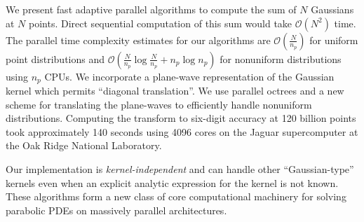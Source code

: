 We present fast adaptive parallel algorithms to compute the sum of $N$ Gaussians at $N$ points. 
Direct sequential computation of this sum would take $\mathcal{O}(N^2)$ time. The parallel time complexity estimates for our algorithms are $ \mathcal{O} \left(\frac{N}{n_p} \right)$ for uniform point distributions and $ \mathcal{O} \left(\frac{N}{n_p}\log \frac{N}{n_p} + n_p \log n_p\right)$ for nonuniform distributions using $n_p$ CPUs. We incorporate a plane-wave representation of the Gaussian kernel which permits ``diagonal translation''. We use parallel octrees and a new scheme for translating the plane-waves to efficiently handle nonuniform distributions. Computing the transform to six-digit accuracy at 120 billion points took approximately 140 seconds using 4096 cores on the Jaguar supercomputer at the Oak Ridge National Laboratory. 

Our implementation is {\em kernel-independent} and can handle other ``Gaussian-type'' kernels even
 when an explicit analytic expression for the kernel is not known. These algorithms form a new class of core computational machinery for solving parabolic PDEs on massively parallel architectures. 